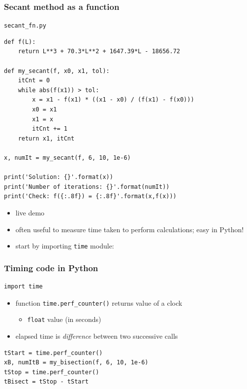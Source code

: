 \documentclass[english,14pt]{beamer}
\begin{document}
\begin{frame}[fragile]

\frametitle{Secant method as a function}

\texttt{secant\_fn.py}
\begin{lstlisting}[style=CStyle,basicstyle=\scriptsize]
def f(L):
    return L**3 + 70.3*L**2 + 1647.39*L - 18656.72

def my_secant(f, x0, x1, tol):
    itCnt = 0
    while abs(f(x1)) > tol:
        x = x1 - f(x1) * ((x1 - x0) / (f(x1) - f(x0)))
        x0 = x1
        x1 = x
        itCnt += 1
    return x1, itCnt

x, numIt = my_secant(f, 6, 10, 1e-6)

print('Solution: {}'.format(x))
print('Number of iterations: {}'.format(numIt))
print('Check: f({:.8f}) = {:.8f}'.format(x,f(x)))
\end{lstlisting}

\begin{itemize}
	\item live demo
\end{itemize}

\end{frame}


\begin{frame}[fragile]

\begin{itemize}
	\item often useful to measure time taken to perform calculations; easy in Python!
	\item start by importing \texttt{time} module:
\end{itemize}

\frametitle{Timing code in Python}
\begin{lstlisting}[style=CStyle,basicstyle=\scriptsize]
import time
\end{lstlisting}

\begin{itemize}
	\item function \texttt{time.perf\_counter()} returns value of a clock
	\begin{itemize}
		\item \texttt{float} value (in seconds) 
	\end{itemize}
	\item elapsed time is \emph{difference} between two successive calls
\end{itemize}

\begin{lstlisting}[style=CStyle,basicstyle=\scriptsize]
tStart = time.perf_counter()
xB, numItB = my_bisection(f, 6, 10, 1e-6)
tStop = time.perf_counter()
tBisect = tStop - tStart
\end{lstlisting}

\end{frame}
\end{document}

